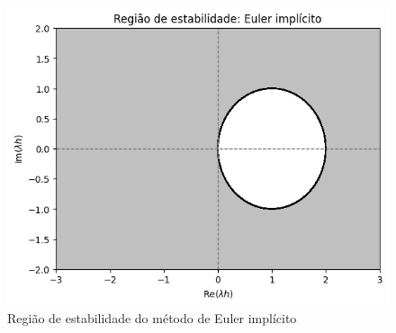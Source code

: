 \begin{figure}
    \centering
    \includegraphics[width=0.5\linewidth]{tcc/img/regiao_estabilidade_euler_implicito.png}
    \caption{Região de estabilidade do método de Euler implícito}
    \label{fig:regiao_estabilidade_euler_implicito}
\end{figure}

